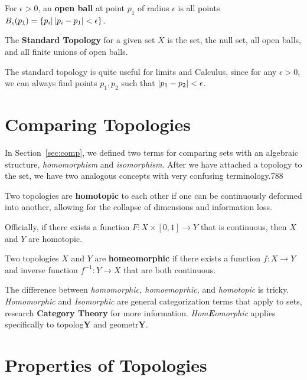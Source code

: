 \begin{definition}
  For $\epsilon > 0$, an \textbf{open ball} at point $p_1$ of radius $\epsilon$ is all points $B_{\epsilon}(p_1)= \{p_i | \left| p_i - p_1 \right|<\epsilon \}$.
\end{definition}

\begin{definition} \label{def:standardtop}
  The \textbf{Standard Topology} for a given set $X$ is the set, the null set, all open balls, and all finite unions of open balls.
\end{definition}

The standard topology is quite useful for limits and Calculus, since for any $\epsilon >0$, we can always find points $p_1, p_2$ such that $\left| p_1 - p_2 \right| <\epsilon$.

\section{Comparing Topologies}
In Section~\ref{sec:comp}, we defined two terms for comparing sets with an algebraic structure, \textit{homomorphism} and \textit{isomorphism}.  After we have attached a topology to the set, we have two analogous concepts with very confusing terminology.788

\begin{definition}[Homotopic]
  Two topologies are \textbf{homotopic} to each other if one can be continuously deformed into another, allowing for the collapse of dimensions and information loss.

  Officially, if there exists a function $F:X\times[0,1] \rightarrow Y$ that is continuous, then $X$ and $Y$ are homotopic.
\end{definition}

\begin{definition}[Homeomorphism]
  Two topologies $X$ and $Y$ are \textbf{homeomorphic} if there exists a function $f: X \rightarrow Y$ and inverse function $f^{-1}: Y \rightarrow X$ that are both continuous.
\end{definition}

The difference between \textit{homomorphic, homoemoprhic,} and \textit{homotopic} is tricky.  \textit{Homomorphic} and \textit{Isomorphic} are general categorization terms that apply to sets, research \textbf{Category Theory} for more information.  \textit{Hom\textbf{E}omorphic} applies specifically to topolog\textbf{Y} and geometr\textbf{Y}.

\section{Properties of Topologies}

